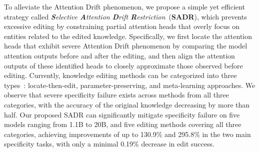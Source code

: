 To alleviate the Attention Drift phenomenon, we propose a simple yet efficient strategy called \textit{\textbf{S}elective \textbf{A}ttention \textbf{D}rift \textbf{R}estriction}~(\textbf{SADR}), which prevents excessive editing by constraining partial attention heads that overly focus on entities related to the edited knowledge. 
Specifically, we first locate the attention heads that exhibit severe Attention Drift phenomenon by comparing the model attention outputs before and after the editing, and then align the attention outputs of these identified heads to closely approximate those observed before editing.
Currently, knowledge editing methods can be categorized into three types~\citep{yao2023editing}: locate-then-edit, parameter-preserving, and meta-learning approaches. 
We observe that severe specificity failure exists across methods from all three categories, with the accuracy of the original knowledge decreasing by more than half.
Our proposed SADR can significantly mitigate specificity failure on five models ranging from 1.1B to 20B, and five editing methods covering all three categories, achieving improvements of up to 130.9\% and 295.8\% in the two main specificity tasks, with only a minimal 0.19\% decrease in edit success.
